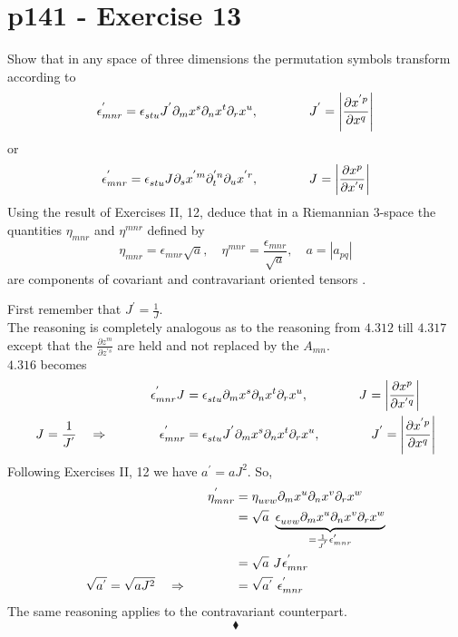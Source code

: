 \section{p141 - Exercise 13}
\begin{tcolorbox}
Show that in any space of three dimensions the permutation symbols transform according to
$$\epsilon^{'}_{mnr}= \epsilon^{}_{stu}J^{'}\partial_m x^s\partial_n x^t\partial_r x^u, \quad\quad\quad\quad J^{'}= \left|\frac{\partial x^{'p}}{\partial x^{q}}\right|$$
or
$$\epsilon^{'}_{mnr}= \epsilon^{}_{stu}J^{}\partial_s x^{'m}\partial_t ^{'n}\partial_u x^{'r}, \quad\quad\quad\quad J^{}= \left|\frac{\partial x^{p}}{\partial x^{'q}}\right|$$
Using the result of Exercises II, 12, deduce that in a Riemannian 3-space the quantities $\eta_{mnr}$ and $\eta^{mnr}$ defined by 
$$ \eta_{mnr}= \epsilon^{}_{mnr}\sqrt{a}, \quad \eta^{mnr}= \frac{\epsilon^{}_{mnr}}{\sqrt{a}}, \quad a=\left|a_{pq}\right|$$
are components of covariant and contravariant oriented tensors .
\end{tcolorbox}
First remember that $J^{'}= \frac{1}{J}$.\\
The reasoning is completely analogous as to the reasoning from $\mathbf{4.312}$ till $\mathbf{4.317}$ except that the $\frac{\partial z^{m}}{\partial z^{'s}}$ are held and not replaced by the $A_{mn}$.\\
$\mathbf{4.316}$ becomes
\begin{align}
\epsilon^{'}_{mnr}J^{}&= \epsilon^{}_{stu}\partial_m x^s\partial_n x^t\partial_r x^u, \quad\quad\quad\quad J^{}= \left|\frac{\partial x^{p}}{\partial x^{'q}}\right|\\
J^{}= \frac{1}{J^{'}}\quad \Rightarrow\quad\quad\quad\quad\epsilon^{'}_{mnr}&= \epsilon^{}_{stu}J^{'}\partial_m x^s\partial_n x^t\partial_r x^u, \quad\quad\quad\quad J^{'}= \left|\frac{\partial x^{'p}}{\partial x^{q}}\right|
\end{align}
Following Exercises II, 12  we have $a^{'} = aJ^2$. So,
\begin{align}
\eta^{'}_{mnr} &=\eta^{}_{uvw} \partial_m x^u\partial_n x^v\partial_r x^w\\
&=\sqrt{a}\ \underbrace{\epsilon^{}_{uvw}\partial_m x^u\partial_n x^v\partial_r x^w}_{= \frac{1}{J^{'}}\epsilon^{'}_{mnr}}\\
&=\sqrt{a}\ J^{}\epsilon^{'}_{mnr}\\
\sqrt{a^{'}} = \sqrt{aJ^2}\quad\Rightarrow\spatie&= \sqrt{a^{'}}\ \epsilon^{'}_{mnr}
\end{align}
The same reasoning applies to the contravariant counterpart.
$$\blacklozenge$$
\newpage

